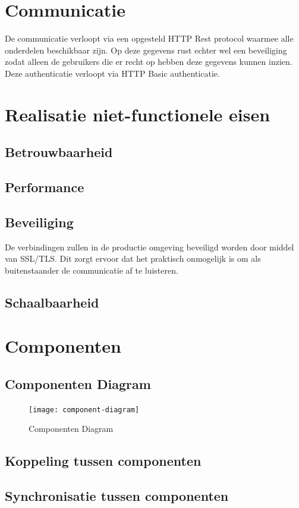 \documentclass{scrreprt}
\begin{document}
	\chapter{Communicatie}
		De communicatie verloopt via een opgesteld HTTP Rest protocol waarmee alle onderdelen beschikbaar zijn. Op deze gegevens rust echter wel een beveiliging zodat alleen de gebruikers die er recht op hebben deze gegevens kunnen inzien. Deze authenticatie verloopt via HTTP Basic authenticatie.
	
	\newpage
	\chapter{Realisatie niet-functionele eisen}
	\section{Betrouwbaarheid}
	\section{Performance}
	\section{Beveiliging}
		De verbindingen zullen in de productie omgeving beveiligd worden door middel van SSL/TLS. Dit zorgt ervoor dat het praktisch onmogelijk is om als buitenstaander de communicatie af te luisteren.
	\section{Schaalbaarheid}
	
	\newpage
	\chapter{Componenten}
	\section{Componenten Diagram}
	\begin{figure}[ht]
		\centering
		\texttt{[image: component-diagram]}
		\label{pic:component-diagram}
		\caption{Componenten Diagram}
	\end{figure}
	\section{Koppeling tussen componenten}
	\section{Synchronisatie tussen componenten}
\end{document}
